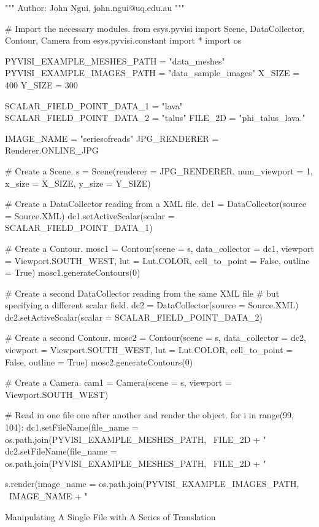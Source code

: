 \begin{python}
"""
Author: John Ngui, john.ngui@uq.edu.au
"""

# Import the necessary modules.
from esys.pyvisi import Scene, DataCollector, Contour, Camera 
from esys.pyvisi.constant import *
import os

PYVISI_EXAMPLE_MESHES_PATH = "data_meshes"
PYVISI_EXAMPLE_IMAGES_PATH = "data_sample_images"
X_SIZE = 400
Y_SIZE = 300

SCALAR_FIELD_POINT_DATA_1 = "lava"
SCALAR_FIELD_POINT_DATA_2 = "talus"
FILE_2D = "phi_talus_lava."

IMAGE_NAME = "seriesofreads"
JPG_RENDERER = Renderer.ONLINE_JPG

# Create a Scene.
s = Scene(renderer = JPG_RENDERER, num_viewport = 1, x_size = X_SIZE, 
        y_size = Y_SIZE)

# Create a DataCollector reading from a XML file. 
dc1 = DataCollector(source = Source.XML)
dc1.setActiveScalar(scalar = SCALAR_FIELD_POINT_DATA_1)

# Create a Contour.
mosc1 = Contour(scene = s, data_collector = dc1, 
        viewport = Viewport.SOUTH_WEST, lut = Lut.COLOR, cell_to_point = False,
        outline = True)
mosc1.generateContours(0)

# Create a second DataCollector reading from the same XML file
# but specifying a different scalar field. 
dc2 = DataCollector(source = Source.XML)
dc2.setActiveScalar(scalar = SCALAR_FIELD_POINT_DATA_2)

# Create a second Contour.
mosc2 = Contour(scene = s, data_collector = dc2, 
        viewport = Viewport.SOUTH_WEST, lut = Lut.COLOR, cell_to_point = False,
        outline = True)
mosc2.generateContours(0)

# Create a Camera.
cam1 = Camera(scene = s, viewport = Viewport.SOUTH_WEST)

# Read in one file one after another and render the object. 
for i in range(99, 104):
    dc1.setFileName(file_name =  os.path.join(PYVISI_EXAMPLE_MESHES_PATH, \
	        FILE_2D + "%
    dc2.setFileName(file_name =  os.path.join(PYVISI_EXAMPLE_MESHES_PATH, \
            FILE_2D + "%

    s.render(image_name = os.path.join(PYVISI_EXAMPLE_IMAGES_PATH, \
            IMAGE_NAME + "%
\end{python}

\textsf{Manipulating A Single File with A Series of Translation}

